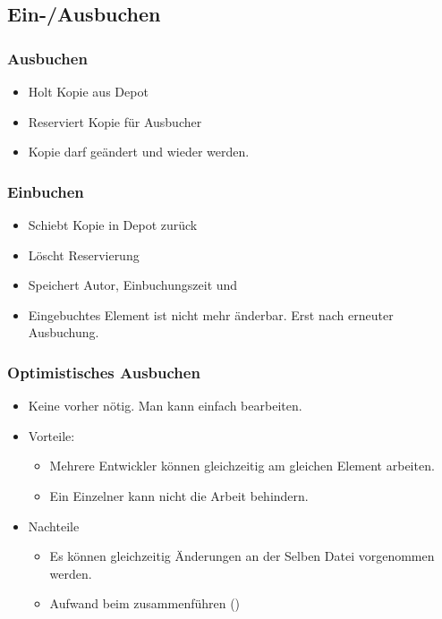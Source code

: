 \subsection{Ein-/Ausbuchen}

\subsubsection{Ausbuchen}
\begin{itemize}
    \item Holt Kopie aus Depot
    \item Reserviert Kopie für Ausbucher
    \item Kopie darf geändert und wieder  werden.
\end{itemize}
\subsubsection{Einbuchen}
\begin{itemize}
    \item Schiebt Kopie in Depot zurück
    \item Löscht Reservierung
    \item Speichert Autor, Einbuchungszeit und 
    \item Eingebuchtes Element ist nicht mehr änderbar. Erst nach erneuter Ausbuchung.
\end{itemize}

\subsubsection{Optimistisches Ausbuchen}
\begin{itemize}
    \item Keine  vorher nötig. Man kann einfach bearbeiten.
    \item Vorteile: \begin{itemize}
        \item Mehrere Entwickler können gleichzeitig am gleichen Element arbeiten.
        \item Ein Einzelner kann nicht die Arbeit behindern.
    \end{itemize}
    \item Nachteile \begin{itemize}
        \item Es können gleichzeitig Änderungen an der Selben Datei vorgenommen werden.
        \item Aufwand beim zusammenführen ()
    \end{itemize}
\end{itemize}


